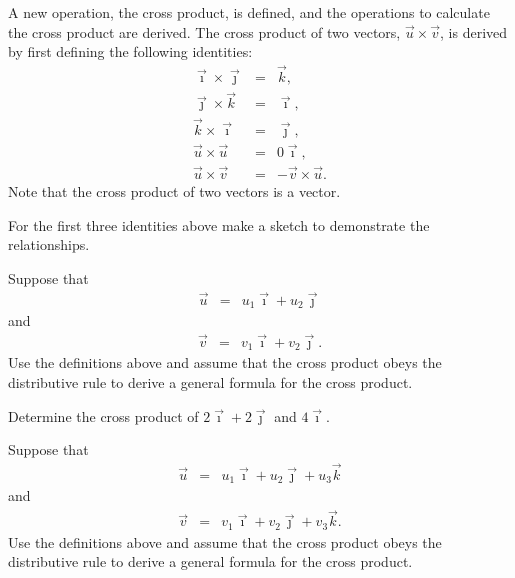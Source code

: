 \begin{problem}
\item A new operation, the cross product, is defined, and the
  operations to calculate the cross product are derived. The cross
  product of two vectors, $\vec{u}\times\vec{v}$, is derived by first
  defining the following identities:
  \begin{eqnarray*}
    \vec{\imath} \times \vec{\jmath} & = & \vec{k}, \\
    \vec{\jmath} \times \vec{k} & = & \vec{\imath}, \\
    \vec{k} \times \vec{\imath} & = & \vec{\jmath}, \\
    \vec{u} \times \vec{u} & = & 0 \vec{\imath}, \\
    \vec{u} \times \vec{v} & = & - \vec{v} \times \vec{u}.
  \end{eqnarray*}
  Note that the cross product of two vectors is a vector.
  \begin{subproblem}
  \item For the first three identities above make a sketch to
    demonstrate the relationships.
    \vfill

    \clearpage

  \item Suppose that
    \begin{eqnarray*}
      \vec{u} & = & u_1 \vec{\imath} + u_2 \vec{\jmath}
    \end{eqnarray*}
    and
    \begin{eqnarray*}
      \vec{v} & = & v_1 \vec{\imath} + v_2 \vec{\jmath}.
    \end{eqnarray*}
    Use the definitions above and assume that the cross product obeys
    the distributive rule to derive a general formula for the cross
    product.
    \vfill
    \vfill

  \item Determine the cross product of $2 \vec{\imath} + 2\vec{\jmath}$ and $4 \vec{\imath}$.
    \vfill

    \clearpage

  \item Suppose that
    \begin{eqnarray*}
      \vec{u} & = & u_1 \vec{\imath} + u_2 \vec{\jmath} + u_3 \vec{k}
    \end{eqnarray*}
    and
    \begin{eqnarray*}
      \vec{v} & = & v_1 \vec{\imath} + v_2 \vec{\jmath} + v_3 \vec{k}.
    \end{eqnarray*}
    Use the definitions above and assume that the cross product obeys
    the distributive rule to derive a general formula for the cross product.
    \vfill

  \end{subproblem}
\end{problem}


